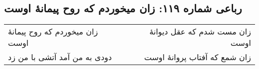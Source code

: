 \begin{center}
\section*{رباعی شماره ۱۱۹: زان میخوردم که روح پیمانهٔ اوست}
\label{sec:sh119}
\begin{longtable}{l p{0.5cm} r}
زان میخوردم که روح پیمانهٔ اوست
&&
زان مست شدم که عقل دیوانهٔ اوست
\\
دودی به من آمد آتشی با من زد
&&
زان شمع که آفتاب پروانهٔ اوست
\\
\end{longtable}
\end{center}
